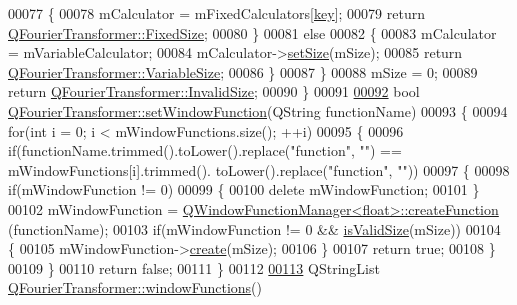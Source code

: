\begin{DoxyCode}
00077         \{
00078             mCalculator = mFixedCalculators[\hyperlink{a00116_a94bb892c30911cd62cba0707a5395be4}{key}];
00079             \textcolor{keywordflow}{return} \hyperlink{a00054_aeb481656565bc92ec7b2f3e9d5d883c3ae3372a4b83acd17582e488aee5f24628}{QFourierTransformer::FixedSize};
00080         \}
00081         \textcolor{keywordflow}{else}
00082         \{
00083             mCalculator = mVariableCalculator;
00084             mCalculator->\hyperlink{a00052_a8eef0ee0494f04e73191890de476795a}{setSize}(mSize);
00085             \textcolor{keywordflow}{return} \hyperlink{a00054_aeb481656565bc92ec7b2f3e9d5d883c3a3a916ec9c101f1aec97505fd9cd8e2df}{QFourierTransformer::VariableSize};
00086         \}
00087     \}
00088     mSize = 0;
00089     \textcolor{keywordflow}{return} \hyperlink{a00054_aeb481656565bc92ec7b2f3e9d5d883c3afd5de59c99b31f3aa65223d87a2aaaea}{QFourierTransformer::InvalidSize};
00090 \}
00091 
\hypertarget{a00121_source_l00092}{}\hyperlink{a00054_a8c8f0a2101aba7f6da70050c7ebdc36c}{00092} \textcolor{keywordtype}{bool} \hyperlink{a00054_a8c8f0a2101aba7f6da70050c7ebdc36c}{QFourierTransformer::setWindowFunction}(QString functionName)
00093 \{
00094     \textcolor{keywordflow}{for}(\textcolor{keywordtype}{int} i = 0; i < mWindowFunctions.size(); ++i)
00095     \{
00096         \textcolor{keywordflow}{if}(functionName.trimmed().toLower().replace(\textcolor{stringliteral}{"function"}, \textcolor{stringliteral}{""}) == mWindowFunctions[i].trimmed().
      toLower().replace(\textcolor{stringliteral}{"function"}, \textcolor{stringliteral}{""}))
00097         \{
00098             \textcolor{keywordflow}{if}(mWindowFunction != 0)
00099             \{
00100                 \textcolor{keyword}{delete} mWindowFunction;
00101             \}
00102             mWindowFunction = \hyperlink{a00072_a3c72b178730b8731087337bcbfcbd4b7}{QWindowFunctionManager<float>::createFunction}
      (functionName);
00103             \textcolor{keywordflow}{if}(mWindowFunction != 0 && \hyperlink{a00054_ac6ce59f26c2e51bc91f16ba42cf059a4}{isValidSize}(mSize))
00104             \{
00105                 mWindowFunction->\hyperlink{a00071_a23ec85a35c762367195a47898cc75380}{create}(mSize);
00106             \}
00107             \textcolor{keywordflow}{return} \textcolor{keyword}{true};
00108         \}
00109     \}
00110     \textcolor{keywordflow}{return} \textcolor{keyword}{false};
00111 \}
00112 
\hypertarget{a00121_source_l00113}{}\hyperlink{a00054_a61125fbf2b312c745d71fe8bdd3f2d26}{00113} QStringList \hyperlink{a00054_a61125fbf2b312c745d71fe8bdd3f2d26}{QFourierTransformer::windowFunctions}()

\end{DoxyCode}
